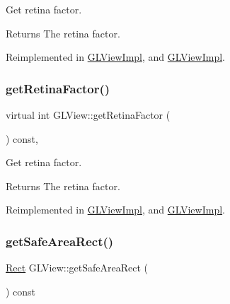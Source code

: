 Get retina factor.

\begin{DoxyReturn}{Returns}
The retina factor. 
\end{DoxyReturn}


Reimplemented in \hyperlink{classGLViewImpl_a0844b876076edafc4f6e47e3fafb16da}{G\+L\+View\+Impl}, and \hyperlink{classGLViewImpl_a0844b876076edafc4f6e47e3fafb16da}{G\+L\+View\+Impl}.

\mbox{\label{classGLView_a5dd430351b6192d7c014458e7863ba6d}} 
\subsubsection{\texorpdfstring{get\+Retina\+Factor()}{getRetinaFactor()}\hspace{0.1cm}{\footnotesize\ttfamily [2/2]}}
{\footnotesize\ttfamily virtual int G\+L\+View\+::get\+Retina\+Factor (\begin{DoxyParamCaption}{ }\end{DoxyParamCaption}) const\hspace{0.3cm}{\ttfamily [inline]}, {\ttfamily [virtual]}}

Get retina factor.

\begin{DoxyReturn}{Returns}
The retina factor. 
\end{DoxyReturn}


Reimplemented in \hyperlink{classGLViewImpl_a0844b876076edafc4f6e47e3fafb16da}{G\+L\+View\+Impl}, and \hyperlink{classGLViewImpl_a0844b876076edafc4f6e47e3fafb16da}{G\+L\+View\+Impl}.

\mbox{\label{classGLView_a2faaa7d06e887d6e8c832868f23e0adc}} 
\subsubsection{\texorpdfstring{get\+Safe\+Area\+Rect()}{getSafeAreaRect()}}
{\footnotesize\ttfamily \hyperlink{classRect}{Rect} G\+L\+View\+::get\+Safe\+Area\+Rect (\begin{DoxyParamCaption}{ }\end{DoxyParamCaption}) const\hspace{0.3cm}{\ttfamily [virtual]}}

